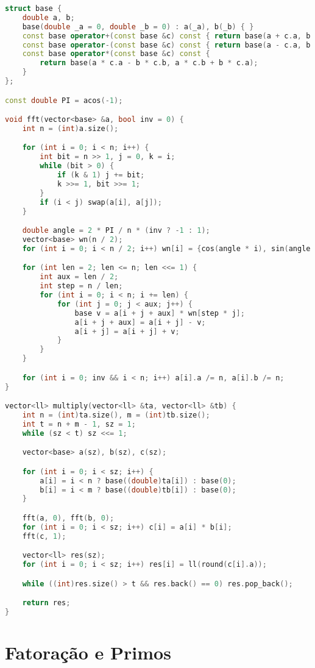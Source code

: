 \documentclass[10pt, a4paper, oneside]{book}
\begin{document}
\begin{lstlisting}[language=C++]
struct base {
    double a, b;
    base(double _a = 0, double _b = 0) : a(_a), b(_b) { }
    const base operator+(const base &c) const { return base(a + c.a, b + c.b); }
    const base operator-(const base &c) const { return base(a - c.a, b - c.b); }
    const base operator*(const base &c) const {
        return base(a * c.a - b * c.b, a * c.b + b * c.a);
    }
};

const double PI = acos(-1);

void fft(vector<base> &a, bool inv = 0) {
    int n = (int)a.size();

    for (int i = 0; i < n; i++) {
        int bit = n >> 1, j = 0, k = i;
        while (bit > 0) {
            if (k & 1) j += bit;
            k >>= 1, bit >>= 1;
        }
        if (i < j) swap(a[i], a[j]);
    }

    double angle = 2 * PI / n * (inv ? -1 : 1);
    vector<base> wn(n / 2);
    for (int i = 0; i < n / 2; i++) wn[i] = {cos(angle * i), sin(angle * i)};

    for (int len = 2; len <= n; len <<= 1) {
        int aux = len / 2;
        int step = n / len;
        for (int i = 0; i < n; i += len) {
            for (int j = 0; j < aux; j++) {
                base v = a[i + j + aux] * wn[step * j];
                a[i + j + aux] = a[i + j] - v;
                a[i + j] = a[i + j] + v;
            }
        }
    }

    for (int i = 0; inv && i < n; i++) a[i].a /= n, a[i].b /= n;
}

vector<ll> multiply(vector<ll> &ta, vector<ll> &tb) {
    int n = (int)ta.size(), m = (int)tb.size();
    int t = n + m - 1, sz = 1;
    while (sz < t) sz <<= 1;

    vector<base> a(sz), b(sz), c(sz);

    for (int i = 0; i < sz; i++) {
        a[i] = i < n ? base((double)ta[i]) : base(0);
        b[i] = i < m ? base((double)tb[i]) : base(0);
    }

    fft(a, 0), fft(b, 0);
    for (int i = 0; i < sz; i++) c[i] = a[i] * b[i];
    fft(c, 1);

    vector<ll> res(sz);
    for (int i = 0; i < sz; i++) res[i] = ll(round(c[i].a));

    while ((int)res.size() > t && res.back() == 0) res.pop_back();

    return res;
}
\end{lstlisting}
\hfill

\section{Fatoração e Primos}
\end{document}
